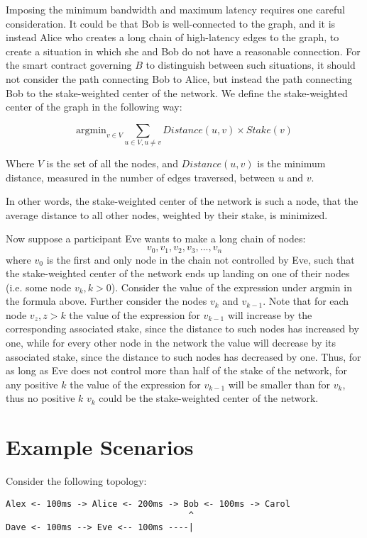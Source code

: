 \documentclass{article}
\begin{document}
Imposing the minimum bandwidth and maximum latency requires one careful consideration. It could be that Bob is well-connected to the graph, and it is instead Alice who creates a long chain of high-latency edges to the graph, to create a situation in which she and Bob do not have a reasonable connection. For the smart contract governing $B$ to distinguish between such situations, it should not consider the path connecting Bob to Alice, but instead the path connecting Bob to the stake-weighted center of the network. We define the stake-weighted center of the graph in the following way:

$$ \mathrm{argmin}_{v \in V}{\sum_{u \in V, u \ne v}{Distance(u, v) \times Stake(v)}} $$

Where \( V \) is the set of all the nodes, and \( Distance(u, v) \) is the minimum distance, measured in the number of edges traversed, between \( u \) and \( v \).

In other words, the stake-weighted center of the network is such a node, that the average distance to all other nodes, weighted by their stake, is minimized.

Now suppose a participant Eve wants to make a long chain of nodes: $$ v_0, v_1, v_2, v_3, ..., v_n $$ where \( v_0 \) is the first and only node in the chain not controlled by Eve, such that the stake-weighted center of the network ends up landing on one of their nodes (i.e. some node \( v_k, k > 0 \)). Consider the value of the expression under \( \mathrm{argmin} \) in the formula above. Further consider the nodes \( v_k \) and \( v_{k-1} \). Note that for each node \( v_z, z > k \) the value of the expression for \( v_{k-1} \) will increase by the corresponding associated stake, since the distance to such nodes has increased by one, while for every other node in the network the value will decrease by its associated stake, since the distance to such nodes has decreased by one. Thus, for as long as Eve does not control more than half of the stake of the network, for any positive \( k \) the value of the expression for \( v_{k-1} \) will be smaller than for \( v_k \), thus no positive \( k \) \( v_k \) could be the stake-weighted center of the network.

\section{Example Scenarios}

Consider the following topology:

\begin{verbatim}
Alex <- 100ms -> Alice <- 200ms -> Bob <- 100ms -> Carol
                                    ^
Dave <- 100ms --> Eve <-- 100ms ----|
\end{verbatim}
\end{document}
